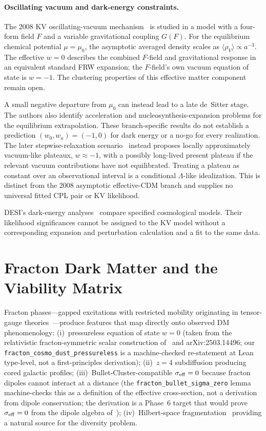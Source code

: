 \documentclass[aps,prd,twocolumn,showpacs,superscriptaddress,nofootinbib]{revtex4-2}
\begin{document}
\paragraph*{Oscillating vacuum and dark-energy constraints.}
The 2008 KV oscillating-vacuum mechanism~\cite{KV2008b} is studied in a model
with a four-form field $F$ and a variable gravitational coupling $G(F)$.
For the equilibrium chemical potential $\mu=\mu_0$, the asymptotic
averaged density scales as $\langle\rho_V\rangle\propto a^{-3}$.
The effective $w=0$ describes the combined $F$-field and gravitational
response in an equivalent standard FRW expansion; the $F$-field's own
vacuum equation of state is $w=-1$. The clustering properties of this
effective matter component remain open.

A small negative departure from $\mu_0$ can instead lead to a late
de~Sitter stage. The authors also identify acceleration and
nucleosynthesis-expansion problems for the equilibrium extrapolation.
These branch-specific results do not establish a prediction
$(w_0,w_a)=(-1,0)$ for dark energy or a no-go for every realization.
The later stepwise-relaxation scenario~\cite{KV2011Plateaux} instead
proposes locally approximately vacuum-like plateaux, $w\approx-1$,
with a possibly long-lived present plateau if the relevant vacuum
contributions have not equilibrated. Treating a plateau as constant
over an observational interval is a conditional $\Lambda$-like
idealization. This is distinct from the 2008 asymptotic effective-CDM
branch and supplies no universal fitted CPL pair or KV likelihood.

DESI's dark-energy analyses~\cite{DESI2024,DESI2025} compare specified
cosmological models. Their likelihood significances cannot be assigned
to the KV model without a corresponding expansion and perturbation
calculation and a fit to the same data.

\section{Fracton Dark Matter and the Viability Matrix}
\label{sec:fracton}

Fracton phases---gapped excitations with restricted mobility originating
in tensor-gauge theories~\cite{Pretko2017,Nandkishore2019}---produce
features that map directly onto observed DM phenomenology:
(i)~pressureless equation of state $w = 0$ (taken from the relativistic
fracton-symmetric scalar construction of~\cite{Pretko2017} and
arXiv:2503.14496; our \texttt{fracton\_cosmo\_dust\_pressureless} is a
machine-checked re-statement at Lean type-level, not a first-principles
derivation); (ii)~$z=4$ subdiffusion producing cored galactic profiles;
(iii)~Bullet-Cluster-compatible $\sigma_{\rm eff} = 0$ because fracton
dipoles cannot interact at a distance (the \texttt{fracton\_bullet\_sigma\_zero}
lemma machine-checks this as a definition of the effective
cross-section, not a derivation from dipole conservation; the derivation
is a Phase~6 target that would prove $\sigma_{\rm eff} = 0$ from the
dipole algebra of~\cite{Pretko2017}); (iv)~Hilbert-space
fragmentation~\cite{Shen2022} providing a
natural source for the diversity problem.
\end{document}
